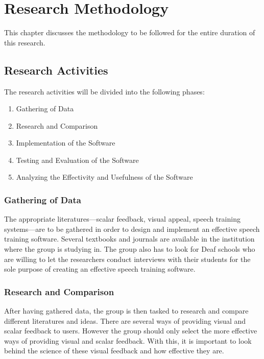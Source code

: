 %
%
%                 

\chapter{Research Methodology}
This chapter discusses the methodology to be followed for the entire duration of this research.

\section{Research Activities}
The research activities will be divided into the following phases:
\begin{enumerate}
\item Gathering of Data
\item Research and Comparison
\item Implementation of the Software
\item Testing and Evaluation of the Software
\item Analyzing the Effectivity and Usefulness of the Software
\end{enumerate}

\subsection{Gathering of Data}
The appropriate literatures---scalar feedback, visual appeal, speech training systems---are to be gathered in order to design and implement an effective speech training software. Several textbooks and journals are available in the institution where the group is studying in. The group also has to look for Deaf schools who are willing to let the researchers conduct interviews with their students for the sole purpose of creating an effective speech training software.

\subsection{Research and Comparison}
After having gathered data, the group is then tasked to research and compare different literatures and ideas. There are several ways of providing visual and scalar feedback to users. However the group should only select the more effective ways of providing visual and scalar feedback. With this, it is important to look behind the science of these visual feedback and how effective they are.

